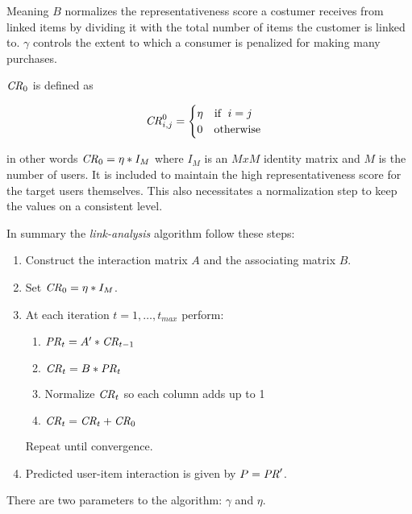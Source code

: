 Meaning $B$ normalizes the representativeness score a costumer receives from linked items by dividing it with the total number of items the customer is linked to.  $\gamma$ controls the extent to which a consumer is penalized for making many purchases.

$\mathit{CR}_0$ is defined as

\begin{equation}
    \mathit{CR}_{i, j}^0 = \begin{cases}
        \eta \quad \text{if } \; i = j \\
        0    \quad \text{otherwise}
    \end{cases}
\end{equation}

in other words $\mathit{CR}_0 = \eta * I_M$ where $I_M$ is an $M x M$ identity matrix and $M$ is the number of users.  It is included to maintain the high representativeness score for the target users themselves. This also necessitates a normalization step to keep the values on a consistent level.

In summary the \textit{link-analysis} algorithm follow these steps:

\begin{enumerate}
    \item Construct the interaction matrix $A$ and the associating matrix $B$.

    \item Set $\mathit{CR}_0 = \eta * I_M$.
    \item At each iteration $t = 1, \ldots, t_{max}$ perform:

        \begin{enumerate}
            \item $\mathit{PR}_t = A' * \mathit{CR}_{t- 1}$
            \item $\mathit{CR}_t = B * \mathit{PR}_t$
            \item Normalize $\mathit{CR}_t$ so each column adds up to 1
            \item $\mathit{CR}_t = \mathit{CR}_t + \mathit{CR}_0$
        \end{enumerate}

        Repeat until convergence.

    \item Predicted user-item interaction is given by $P = \mathit{PR}'$.

\end{enumerate}

There are two parameters to the algorithm: $\gamma$ and $\eta$.


